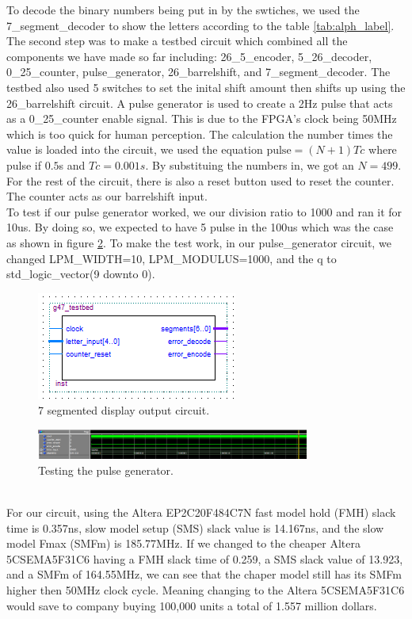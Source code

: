 \documentclass[10pt]{article}
\begin{document}
To decode the binary numbers being put in by the swtiches, we used the 7\_segment\_decoder to show the letters according to the table \ref{tab:alph_label}.
The second step was to make a testbed circuit which combined all the components we have made so far including: 26\_5\_encoder, 5\_26\_decoder, 0\_25\_counter, pulse\_generator, 26\_barrelshift, and 7\_segment\_decoder. The testbed also used 5 switches to set the inital shift amount then shifts up using the 26\_barrelshift circuit. A pulse generator is used to create a 2Hz pulse that acts as a 0\_25\_counter enable signal. This is due to the FPGA's clock being 50MHz which is too quick for human perception. The calculation the number times the value is loaded into the circuit, we used the equation $\text{pulse}=(N+1)Tc$ where pulse if $0.5$s and $Tc=0.001s$. By substituing the numbers in, we got an $N=499$. For the rest of the circuit, there is also a reset button used to reset the counter. The counter acts as our barrelshift input.\\
To test if our pulse generator worked, we our division ratio to 1000 and ran it for 10us. By doing so, we expected to have 5 pulse in the 100us which was the case as shown in figure \ref{fig:test_bed}. To make the test work, in our pulse\_generator circuit, we changed LPM\_WIDTH=10, LPM\_MODULUS=1000, and the q to std\_logic\_vector(9 downto 0).
\begin{figure}[!htb]
    \centering
    \includegraphics[width=.6\textwidth]{./segment.png}
    \caption{7 segmented display output circuit.}
    \label{fig:segment}
\end{figure}
\begin{figure}[!htb]
    \centering
    \includegraphics[width=0.8\textwidth]{./test_bed.png}
    \caption{Testing the pulse generator.}
    \label{fig:test_bed}
\end{figure}\\

For our circuit, using the Altera EP2C20F484C7N fast model hold (FMH) slack time is 0.357ns, slow model setup (SMS) slack value is 14.167ns, and the slow model Fmax (SMFm) is 185.77MHz. If we changed to the cheaper Altera 5CSEMA5F31C6 having a FMH slack time of 0.259, a SMS slack value of 13.923, and a SMFm of 164.55MHz, we can see that the chaper model still has its SMFm higher then 50MHz clock cycle. Meaning changing to the Altera 5CSEMA5F31C6 would save to company buying 100,000 units a total of 1.557 million dollars.
\end{document}
